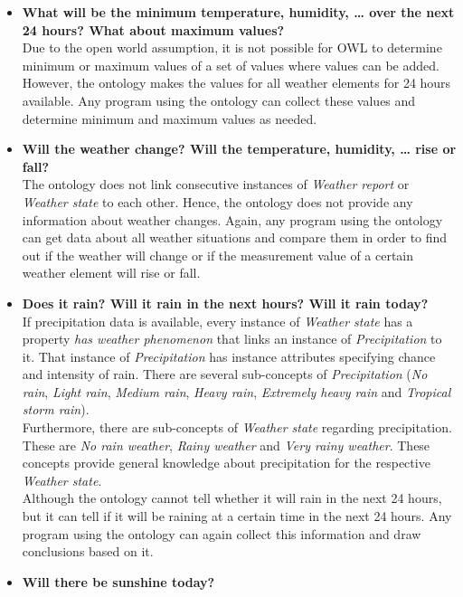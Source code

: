 \begin{itemize}
  \item \textbf{What will be the minimum temperature, humidity, … over the next 24 hours? What about maximum values?}\\ %
    Due to the open world assumption, it is not possible for OWL to determine minimum or maximum values of a set of values where values can be added. However, the \thinkhomeweather ontology makes the values for all weather elements for 24 hours available. Any program using the ontology can collect these values and determine minimum and maximum values as needed.
  \item \textbf{Will the weather change? Will the temperature, humidity, … rise or fall?}\\
    The \thinkhomeweather ontology does not link consecutive instances of \emph{Weather report} or \emph{Weather state} to each other. Hence, the ontology does not provide any information about weather changes. Again, any program using the ontology can get data about all weather situations and compare them in order to find out if the weather will change or if the measurement value of a certain weather element will rise or fall.
  \item \textbf{Does it rain? Will it rain in the next hours? Will it rain today?}\\
    If precipitation data is available, every instance of \emph{Weather state} has a property \emph{has weather phenomenon} that links an instance of \emph{Precipitation} to it. That instance of \emph{Precipitation} has instance attributes specifying chance and intensity of rain. There are several sub-concepts of \emph{Precipitation} (\emph{No rain}, \emph{Light rain}, \emph{Medium rain}, \emph{Heavy rain}, \emph{Extremely heavy rain} and \emph{Tropical storm rain}).\\
    Furthermore, there are sub-concepts of \emph{Weather state} regarding precipitation. These are \emph{No rain weather}, \emph{Rainy weather} and \emph{Very rainy weather}. These concepts provide general knowledge about precipitation for the respective \emph{Weather state}.\\
    Although the \thinkhomeweather ontology cannot tell whether it will rain in the next 24 hours, but it can tell if it will be raining at a certain time in the next 24 hours. Any program using the ontology can again collect this information and draw conclusions based on it.
  \item \textbf{Will there be sunshine today?}\\

\end{itemize}
